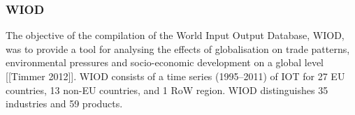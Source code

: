 \subsubsection{WIOD}

The objective of the compilation of the World Input Output Database, WIOD, was
to provide a tool for analysing the effects of globalisation on trade patterns,
environmental pressures and socio-economic development on a global level
[[Timmer 2012]]. WIOD consists of a time series (1995–2011) of IOT for 27 EU
countries, 13 non-EU countries, and 1 RoW region. WIOD distinguishes 35
industries and 59 products.

